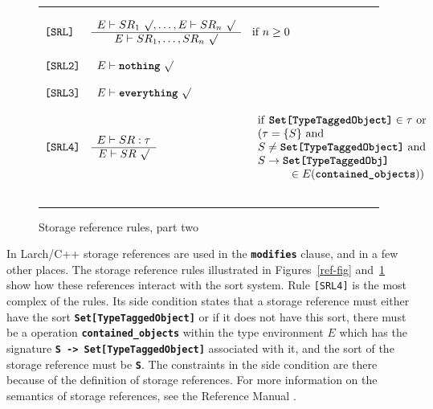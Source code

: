 \documentclass[12pt]{article} %
\newcommand{\reserved}[1]{\textbf{\texttt{#1}}} %
\newcommand{\RULELAB}[1]{\texttt{#1}}
\newcommand{\UNSPACEFORBOX}{\vspace{-2ex}}
\newcommand{\HLINE}{\UNSPACEFORBOX%
\begin{flushleft}\rule{\textwidth}{0.01in}\end{flushleft}%
\UNSPACEFORBOX}
\newenvironment{BFIGURE}{

\begin{figure}
\small
\HLINE
}{
\HLINE
\normalsize
\end{figure}
}
\begin{document}
\begin{BFIGURE}
\begin{displaymath}
\begin{array}{lll}
\RULELAB{[SRL]} &
\begin{array}{c}
E \vdash SR_1~\surd,\dots,E\vdash SR_n~\surd\\
\hline
E \vdash SR_1,\dots,SR_n~\surd
\end{array}
&
\mbox{if $n \geq 0$}
\\
~\\
\RULELAB{[SRL2]} &
\begin{array}{c}
E \vdash \mbox{\reserved{nothing}}~\surd
\end{array}
\\
~\\
\RULELAB{[SRL3]} &
\begin{array}{c}
E \vdash \mbox{\reserved{everything}}~\surd
\end{array}
\\
~\\
\RULELAB{[SRL4]} &
\begin{array}{c}
E \vdash SR:\tau \\
\hline
E \vdash SR~\surd
\end{array}
&
\begin{array}{l}
\mbox{if \reserved{Set[TypeTaggedObject]}} \in \tau \mbox{ or } \\
(\tau = \{S\} \mbox{ and}  \\
S \not= \mbox{\reserved{Set[TypeTaggedObject]}} \mbox{ and} \\
S \rightarrow \mbox{\reserved{Set[TypeTaggedObj]}} \\
~~~~~~~~~\in E(\mbox{\reserved{contained\_objects}}))
\end{array}
\\
~\\
\end{array}
\end{displaymath}
\caption{Storage reference rules, part two}
\label{ref-fig2}
\end{BFIGURE}

In Larch/C++ storage references are used in the \reserved{modifies}
clause, and in a few other places. The storage reference rules
illustrated in Figures~\ref{ref-fig} and~\ref{ref-fig2} show how these
references interact with the sort system. Rule \RULELAB{[SRL4]} is the
most complex of the rules. Its side condition states that a storage
reference must either have the sort \reserved{Set[TypeTaggedObject]}
or if it does not have this sort, there must be a operation
\reserved{contained\_objects} within the type environment $E$ which
has the signature \reserved{S -> Set[TypeTaggedObject]} associated
with it, and the sort of the storage reference must be \reserved{S}. The
constraints in the side condition are there because of the definition
of storage references. For more information on the
semantics of storage references, see the
Reference Manual \cite[Section 6.2.3.3 and following]{Leavens96c}.
\end{document}
